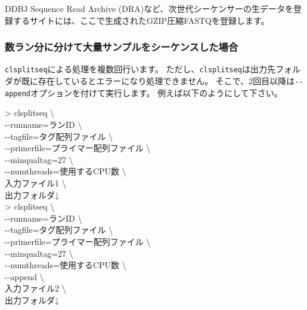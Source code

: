 \documentclass[titlepage,10pt,a4paper]{jsbook}
\newenvironment{cmd}{\begin{oframed}\raggedright\ttfamily\footnotesize\setlength{\baselineskip}{1.4em}}{\end{oframed}\vspace{-1em}}
\begin{document}
DDBJ Sequence Read Archive (DRA)など、次世代シーケンサーの生データを登録するサイトには、ここで生成されたGZIP圧縮FASTQを登録します。

\subsubsection{数ラン分に分けて大量サンプルをシーケンスした場合}
\texttt{clsplitseq}による処理を複数回行います。
ただし、\texttt{clsplitseq}は出力先フォルダが既に存在しているとエラーになり処理できません。
そこで、2回目以降は\texttt{{-}{-}append}オプションを付けて実行します。
例えば以下のようにして下さい。
\begin{cmd}
{\textgreater} clsplitseq {\textbackslash}\\
{-}{-}runname=ランID {\textbackslash}\\
{-}{-}tagfile=タグ配列ファイル {\textbackslash}\\
{-}{-}primerfile=プライマー配列ファイル {\textbackslash}\\
{-}{-}minqualtag=27 {\textbackslash}\\
{-}{-}numthreads=使用するCPU数 {\textbackslash}\\
入力ファイル1 {\textbackslash}\\
出力フォルダ↓\\
{\textgreater} clsplitseq {\textbackslash}\\
{-}{-}runname=ランID {\textbackslash}\\
{-}{-}tagfile=タグ配列ファイル {\textbackslash}\\
{-}{-}primerfile=プライマー配列ファイル {\textbackslash}\\
{-}{-}minqualtag=27 {\textbackslash}\\
{-}{-}numthreads=使用するCPU数 {\textbackslash}\\
{-}{-}append {\textbackslash}\\
入力ファイル2 {\textbackslash}\\
出力フォルダ↓
\end{cmd}
\end{document}
